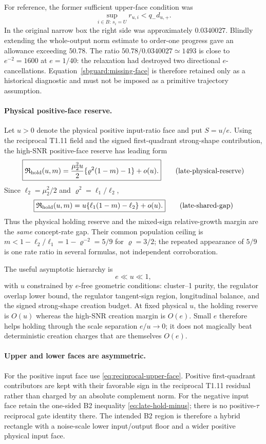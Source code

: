 \documentclass{article} %
\theoremstyle{plain}
\theoremstyle{definition}
\theoremstyle{remark}
\begin{document}
For reference, the former sufficient upper-face condition was
\begin{equation}\label{sbguard:missing-face}
 \sup_{i\in B:\,s_i=U}r_{u,i}<q_-d_{u,+}.
\end{equation}
In the original narrow box the right side was approximately $0.0340027$.
Blindly extending the whole-output norm estimate to order-one progress gave an
allowance exceeding $50.78$.  The ratio $50.78/0.0340027\simeq1493$ is close
to $e^{-2}=1600$ at $e=1/40$: the relaxation had destroyed two directional
$e$-cancellations.  Equation~\eqref{sbguard:missing-face} is therefore retained
only as a historical diagnostic and must not be imposed as a primitive
trajectory assumption.

\paragraph{Physical positive-face reserve.}
Let $u>0$ denote the physical positive input-ratio face and put $S=u/e$.
Using the reciprocal T1.11 field and the signed first-quadrant strong-shape
contribution, the high-SNR positive-face reserve has leading form
\[
\boxed{
 \mathfrak R_{\rm hold}(u,m)
 =\frac{\mu_2^2u}{2}\{\varrho^2(1-m)-1\}+o(u).
}
\tag{late-physical-reserve}\label{sbguard:late-physical-reserve}
\]
Since $\ell_2=\mu_2^2/2$ and
$\varrho^2=\ell_1/\ell_2$,
\[
\boxed{
 \mathfrak R_{\rm hold}(u,m)
 =u\{\ell_1(1-m)-\ell_2\}+o(u).
}
\tag{late-shared-gap}\label{sbguard:late-shared-gap}
\]
Thus the physical holding reserve and the mixed-sign relative-growth margin
are the \emph{same} concept-rate gap.  Their common population ceiling is
$m<1-\ell_2/\ell_1=1-\varrho^{-2}=5/9$ for $\varrho=3/2$; the repeated
appearance of $5/9$ is one rate ratio in several formulas, not independent
corroboration.

The useful asymptotic hierarchy is
\[
\boxed{e\ll u\ll1,}
\tag{late-scale-hierarchy}\label{sbguard:late-scale-hierarchy}
\]
with $u$ constrained by $e$-free geometric conditions: cluster--1 purity,
the regulator overlap lower bound, the regulator tangent-sign region,
longitudinal balance, and the signed strong-shape creation budget.  At fixed
physical $u$, the holding reserve is $O(u)$ whereas the high-SNR creation
margin is $O(e)$.  Small $e$ therefore helps holding through the scale
separation $e/u\to0$; it does not magically beat deterministic creation
charges that are themselves $O(e)$.

\paragraph{Upper and lower faces are asymmetric.}
For the positive input face use
\eqref{eq:reciprocal-upper-face}.  Positive first-quadrant contributors are
kept with their favorable sign in the reciprocal T1.11 residual rather than
charged by an absolute complement norm.  For the negative input face retain
the one-sided B2 inequality
\eqref{eq:late-hold-minus}; there is no positive-$\tau$ reciprocal gate
identity there.  The intended B2 region is therefore a hybrid rectangle with
a noise-scale lower input/output floor and a wider positive physical input
face.
\end{document}
